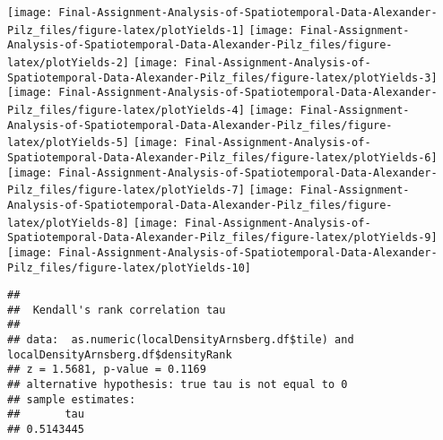 \documentclass[
]{article}
\newenvironment{Shaded}{\begin{snugshade}}{\end{snugshade}}
\newcommand{\AttributeTok}[1]{\textcolor[rgb]{0.77,0.63,0.00}{#1}}
\newcommand{\FunctionTok}[1]{\textcolor[rgb]{0.00,0.00,0.00}{#1}}
\newcommand{\NormalTok}[1]{#1}
\newcommand{\OtherTok}[1]{\textcolor[rgb]{0.56,0.35,0.01}{#1}}
\newcommand{\SpecialCharTok}[1]{\textcolor[rgb]{0.00,0.00,0.00}{#1}}
\newcommand{\StringTok}[1]{\textcolor[rgb]{0.31,0.60,0.02}{#1}}
\begin{document}
\begin{Shaded}
\end{Shaded}

\texttt{[image: Final-Assignment-Analysis-of-Spatiotemporal-Data-Alexander-Pilz\_files/figure-latex/plotYields-1]}
\texttt{[image: Final-Assignment-Analysis-of-Spatiotemporal-Data-Alexander-Pilz\_files/figure-latex/plotYields-2]}
\texttt{[image: Final-Assignment-Analysis-of-Spatiotemporal-Data-Alexander-Pilz\_files/figure-latex/plotYields-3]}
\texttt{[image: Final-Assignment-Analysis-of-Spatiotemporal-Data-Alexander-Pilz\_files/figure-latex/plotYields-4]}
\texttt{[image: Final-Assignment-Analysis-of-Spatiotemporal-Data-Alexander-Pilz\_files/figure-latex/plotYields-5]}
\texttt{[image: Final-Assignment-Analysis-of-Spatiotemporal-Data-Alexander-Pilz\_files/figure-latex/plotYields-6]}
\texttt{[image: Final-Assignment-Analysis-of-Spatiotemporal-Data-Alexander-Pilz\_files/figure-latex/plotYields-7]}
\texttt{[image: Final-Assignment-Analysis-of-Spatiotemporal-Data-Alexander-Pilz\_files/figure-latex/plotYields-8]}
\texttt{[image: Final-Assignment-Analysis-of-Spatiotemporal-Data-Alexander-Pilz\_files/figure-latex/plotYields-9]}
\texttt{[image: Final-Assignment-Analysis-of-Spatiotemporal-Data-Alexander-Pilz\_files/figure-latex/plotYields-10]}

\begin{verbatim}
## 
##  Kendall's rank correlation tau
## 
## data:  as.numeric(localDensityArnsberg.df$tile) and localDensityArnsberg.df$densityRank
## z = 1.5681, p-value = 0.1169
## alternative hypothesis: true tau is not equal to 0
## sample estimates:
##       tau 
## 0.5143445
\end{verbatim}
\end{document}
